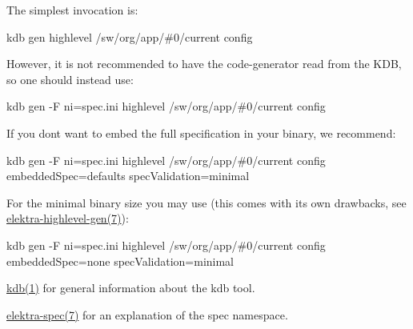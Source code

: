 The simplest invocation is\+:

{\ttfamily kdb gen highlevel /sw/org/app/\#0/current config}

However, it is not recommended to have the code-\/generator read from the K\+DB, so one should instead use\+:

{\ttfamily kdb gen -\/F ni=spec.\+ini highlevel /sw/org/app/\#0/current config}

If you don\textquotesingle{}t want to embed the full specification in your binary, we recommend\+:

{\ttfamily kdb gen -\/F ni=spec.\+ini highlevel /sw/org/app/\#0/current config embedded\+Spec=defaults spec\+Validation=minimal}

For the minimal binary size you may use (this comes with its own drawbacks, see \hyperlink{doc_help_elektra-highlevel-gen_md}{elektra-\/highlevel-\/gen(7)})\+:

{\ttfamily kdb gen -\/F ni=spec.\+ini highlevel /sw/org/app/\#0/current config embedded\+Spec=none spec\+Validation=minimal}


\begin{DoxyItemize}
\item \hyperlink{doc_help_kdb_md}{kdb(1)} for general information about the {\ttfamily kdb} tool.
\item \hyperlink{doc_help_elektra-spec_md}{elektra-\/spec(7)} for an explanation of the {\ttfamily spec} namespace. 
\end{DoxyItemize}